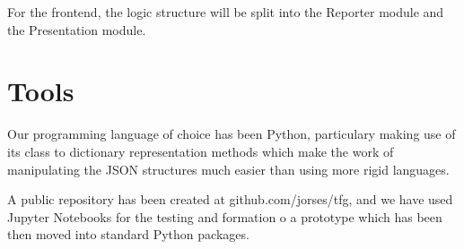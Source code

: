 For the frontend, the logic structure will be split into the Reporter module and the Presentation module.

\section{Tools}
\label{cap1:sec:tools}

Our programming language of choice has been Python, particulary making use of its class to dictionary representation methods which make the work of manipulating the JSON structures much easier than using more rigid languages.

A public repository has been created at github.com/jorses/tfg, and we have used Jupyter Notebooks for the testing and formation o a prototype which has been then moved into standard Python packages.

